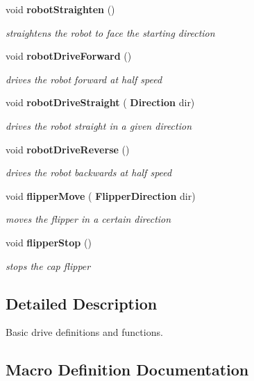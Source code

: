 \begin{DoxyCompactItemize}
void \textbf{ robot\+Straighten} ()
\begin{DoxyCompactList}\small\item\em straightens the robot to face the starting direction \end{DoxyCompactList}\item 
void \textbf{ robot\+Drive\+Forward} ()
\begin{DoxyCompactList}\small\item\em drives the robot forward at half speed \end{DoxyCompactList}\item 
void \textbf{ robot\+Drive\+Straight} (\textbf{ Direction} dir)
\begin{DoxyCompactList}\small\item\em drives the robot straight in a given direction \end{DoxyCompactList}\item 
void \textbf{ robot\+Drive\+Reverse} ()
\begin{DoxyCompactList}\small\item\em drives the robot backwards at half speed \end{DoxyCompactList}\item 
void \textbf{ flipper\+Move} (\textbf{ Flipper\+Direction} dir)
\begin{DoxyCompactList}\small\item\em moves the flipper in a certain direction \end{DoxyCompactList}\item 
void \textbf{ flipper\+Stop} ()
\begin{DoxyCompactList}\small\item\em stops the cap flipper \end{DoxyCompactList}\end{DoxyCompactItemize}


\subsection{Detailed Description}
Basic drive definitions and functions. 



\subsection{Macro Definition Documentation}
\mbox{\label{drive_8h_a4679d8ea8690999a6c6c7c0cb245c879}} 
